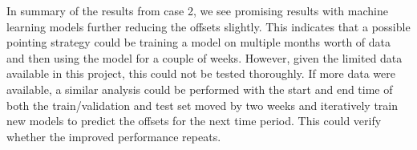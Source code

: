 


In summary of the results from case 2, we see promising results with machine learning models further reducing the offsets slightly.  
This indicates that a possible pointing strategy could be training a model on multiple months worth of data and then using the model for a couple of weeks.
However, given the limited data available in this project, this could not be tested thoroughly.
If more data were available,
a similar analysis could be performed with the start and end time of both the train/validation and test set moved by two weeks and iteratively train new models to predict the offsets for the next time period.
This could verify whether the improved performance repeats.\\



